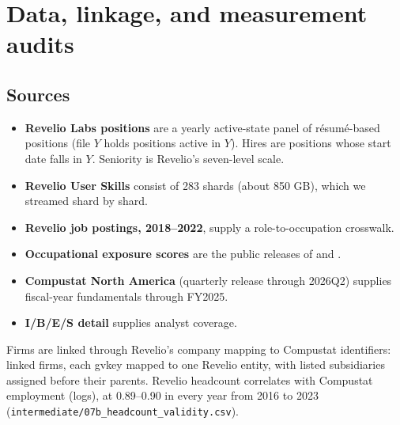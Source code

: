 \documentclass[11pt]{article}
\theoremstyle{remark}\newtheorem{remark}{Remark}
\begin{document}
\section{Data, linkage, and measurement audits}\label{sec:data}

\subsection{Sources}
\begin{itemize}
\item \textbf{Revelio Labs positions} are a yearly active-state panel of r\'esum\'e-based positions (file $Y$ holds positions
active in $Y$). Hires are positions whose start date falls in $Y$. Seniority is Revelio's seven-level scale.
\item \textbf{Revelio User Skills} consist of 283 shards (about 850 GB), which we streamed shard by shard.
\item \textbf{Revelio job postings, 2018--2022}, supply a role-to-occupation crosswalk.
\item \textbf{Occupational exposure scores} are the public releases of \citet{eloundou2024gpts} and
\citet{felten2021occupational,felten2023language}.
\item \textbf{Compustat North America} (quarterly release through 2026Q2) supplies fiscal-year fundamentals through FY2025.
\item \textbf{I/B/E/S detail} supplies analyst coverage.
\end{itemize}
Firms are linked through Revelio's company mapping to Compustat identifiers: \NlinkedFirms linked firms, each gvkey mapped
to one Revelio entity, with listed subsidiaries assigned before their parents. Revelio headcount correlates
\CorrHeadcount with Compustat employment (logs), at 0.89--0.90 in every year from 2016 to 2023
(\texttt{intermediate/07b\_headcount\_validity.csv}).


\end{document}
